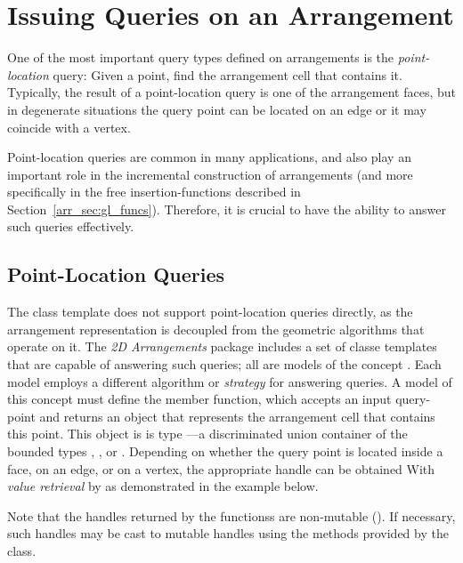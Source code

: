 \section{Issuing Queries on an Arrangement\label{arr_sec:queries}}
One of the most important query types defined on arrangements is
the \emph{point-location} query: Given a point, find the arrangement
cell that contains it. Typically, the result of a point-location
query is one of the arrangement faces, but in degenerate situations
the query point can be located on an edge or it may coincide with a
vertex.

Point-location queries are common in many applications, and also
play an important role in the incremental construction of arrangements
(and more specifically in the free insertion-functions described in
Section~\ref{arr_sec:gl_funcs}). Therefore, it is crucial to have the
ability to answer such queries effectively.

\subsection{Point-Location Queries\label{arr_ssec:pl}}
The  class template does not support point-location
queries directly, as the arrangement representation is decoupled from
the geometric algorithms that operate on it. The \emph{2D Arrangements}
package includes a set of classe templates that are capable of
answering such queries; all are models of the concept
. Each model employs a different
algorithm or \emph{strategy} for answering queries. A model of this
concept must define the  member function, which accepts
an input query-point and returns an object that represents the
arrangement cell that contains this point. This object is is type
---a discriminated
union container of the bounded types ,
, or . Depending on
whether the query point is located inside a face, on an edge, or on a
vertex, the appropriate handle can be obtained With \emph{value retrieval}
by  as demonstrated in the example below.

Note that the handles returned by the  functionss are
non-mutable (). If necessary, such handles may
be cast to mutable handles using the  methods
 provided by the
 class.

